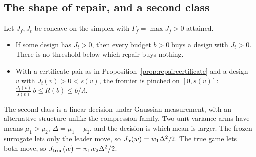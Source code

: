 
\subsection{The shape of repair, and a second class}
\begin{proposition}
\label{prop:shape}
Let $J_f,J_t$ be concave on the simplex with $\Gamma_f=\max J_f>0$ attained.
\begin{itemize}
\item If some design has $J_t>0$, then every budget $b>0$ buys a design with $J_t>0$. There is
no threshold below which repair buys nothing.
\item With a certificate pair as in Proposition~\ref{prop:repaircertificate} and a design $v$
with $J_t(v)>0<s(v)$, the frontier is pinched on $[0,s(v)]$:
$\frac{J_t(v)}{s(v)}\,b\le R(b)\le b/\Lambda$.
\end{itemize}
\end{proposition}

The second class is a linear decision under Gaussian measurement, with an alternative
structure unlike the compression family. Two unit-variance arms have means $\mu_1>\mu_2$,
$\Delta=\mu_1-\mu_2$, and the decision is which mean is larger. The frozen surrogate lets only
the leader move, so $J_{\rm fr}(w)=w_1\Delta^2/2$. The true game lets both move, so
$J_{\rm true}(w)=w_1w_2\Delta^2/2$.

